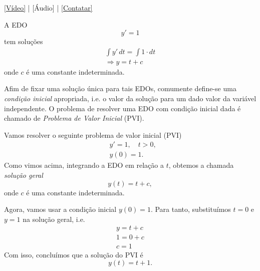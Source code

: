 
\begin{flushright}
  \href{https://archive.org/details/edo-pvi}{[Vídeo]} | [Áudio] | \href{https://phkonzen.github.io/notas/contato.html}{[Contatar]}
\end{flushright}

\begin{ex}
  A EDO
  \begin{equation}
    y' = 1
  \end{equation}
  tem soluções
  \begin{gather}
    \int y'\,dt = \int 1\cdot dt\\
    \Rightarrow y = t + c
  \end{gather}
  onde $c$ é uma constante indeterminada.
\end{ex}

Afim de fixar uma solução única para tais EDOs, comumente define-se uma \emph{condição inicial} apropriada, i.e. o valor da solução para um dado valor da variável independente. O problema de resolver uma EDO com condição inicial dada é chamado de \emph{Problema de Valor Inicial} (PVI).

\begin{ex}
  Vamos resolver o seguinte problema de valor inicial (PVI)
  \begin{align}
    &y' = 1,\quad t>0,\\
    &y(0)=1.
  \end{align}
  Como vimos acima, integrando a EDO em relação a $t$, obtemos a chamada \emph{solução geral}
  \begin{equation}
    y(t) = t + c,
  \end{equation}
  onde $c$ é uma constante indeterminada.

  Agora, vamos usar a condição inicial $y(0)=1$. Para tanto, substituímos $t=0$ e $y=1$ na solução geral, i.e.
  \begin{gather}
    y = t + c\\
    1 = 0 + c\\
    c = 1
  \end{gather}
  Com isso, concluímos que a solução do PVI é
  \begin{equation}
    y(t) = t + 1.
  \end{equation}
\end{ex}


